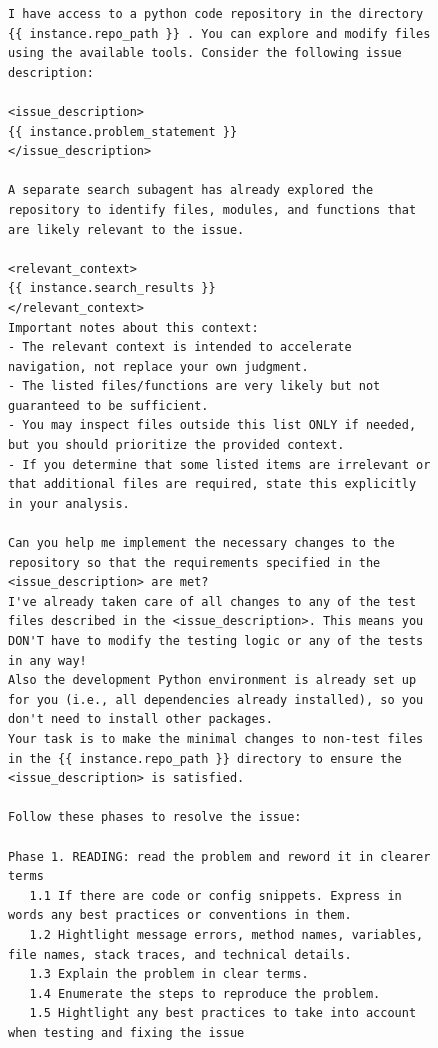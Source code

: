 \begin{figure}[!h]
    \centering
\begin{tcolorbox}[colback=blue!6!white, colframe=blue!45!white, title={\small User Prompt for OpenHands Issue Resolution Agent Augmented with Locations Retrieved by \methodname-14B (continued)}]
\begin{lstlisting}[basicstyle=\fontsize{7.7}{8}\ttfamily]
I have access to a python code repository in the directory {{ instance.repo_path }} . You can explore and modify files using the available tools. Consider the following issue description:

<issue_description>
{{ instance.problem_statement }}
</issue_description>

A separate search subagent has already explored the repository to identify files, modules, and functions that are likely relevant to the issue.

<relevant_context>
{{ instance.search_results }}
</relevant_context>
Important notes about this context:
- The relevant context is intended to accelerate navigation, not replace your own judgment.
- The listed files/functions are very likely but not guaranteed to be sufficient.
- You may inspect files outside this list ONLY if needed, but you should prioritize the provided context.
- If you determine that some listed items are irrelevant or that additional files are required, state this explicitly in your analysis.

Can you help me implement the necessary changes to the repository so that the requirements specified in the <issue_description> are met?
I've already taken care of all changes to any of the test files described in the <issue_description>. This means you DON'T have to modify the testing logic or any of the tests in any way!
Also the development Python environment is already set up for you (i.e., all dependencies already installed), so you don't need to install other packages.
Your task is to make the minimal changes to non-test files in the {{ instance.repo_path }} directory to ensure the <issue_description> is satisfied.

Follow these phases to resolve the issue:

Phase 1. READING: read the problem and reword it in clearer terms
   1.1 If there are code or config snippets. Express in words any best practices or conventions in them.
   1.2 Hightlight message errors, method names, variables, file names, stack traces, and technical details.
   1.3 Explain the problem in clear terms.
   1.4 Enumerate the steps to reproduce the problem.
   1.5 Hightlight any best practices to take into account when testing and fixing the issue


\end{lstlisting}
\end{tcolorbox}
\end{figure}
